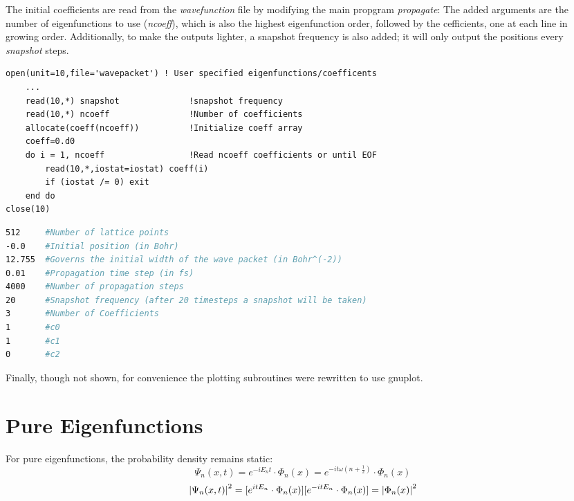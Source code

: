 \documentclass{cis320}
\begin{document}
The initial coefficients are read from the \textit{wavefunction} file by modifying the main propgram \textit{propagate}: The added arguments are the number of eigenfunctions to use (\textit{ncoeff}), which is also the highest eigenfunction order, followed by the cefficients, one at each line in growing order.
Additionally, to make the outputs lighter, a snapshot frequency is also added; it will only output the positions every \textit{snapshot} steps. 
    \begin{lstlisting}[caption=Reading the coefficients in the main program]
open(unit=10,file='wavepacket') ! User specified eigenfunctions/coefficents
    ...
    read(10,*) snapshot              !snapshot frequency
    read(10,*) ncoeff                !Number of coefficients
    allocate(coeff(ncoeff))          !Initialize coeff array
    coeff=0.d0
    do i = 1, ncoeff                 !Read ncoeff coefficients or until EOF 
        read(10,*,iostat=iostat) coeff(i)
        if (iostat /= 0) exit 
    end do
close(10) \end{lstlisting}

    \begin{lstlisting}[language=bash, caption=Wavefunction input file]
512     #Number of lattice points
-0.0    #Initial position (in Bohr)
12.755  #Governs the initial width of the wave packet (in Bohr^(-2))
0.01    #Propagation time step (in fs)
4000    #Number of propagation steps
20      #Snapshot frequency (after 20 timesteps a snapshot will be taken)
3       #Number of Coefficients
1       #c0
1       #c1
0       #c2\end{lstlisting}

Finally, though not shown, for convenience the plotting subroutines were rewritten to use gnuplot.\\

\section{Pure Eigenfunctions}
For pure eigenfunctions, the probability density remains static:
\[
\Psi_{n}(x,t) = e^{-iE_nt} \cdot \Phi_{n}(x) = e^{-it\omega(n+\frac{1}{2})} \cdot \Phi_{n}(x) 
\]\[
 \abs{\Psi_{n}(x,t)}^2 = [ e^{itE_n} \cdot \Phi_{n}(x)][e^{-itE_n} \cdot \Phi_{n}(x)] = \abs{\Phi_n(x)}^2 
\]
\end{document}
